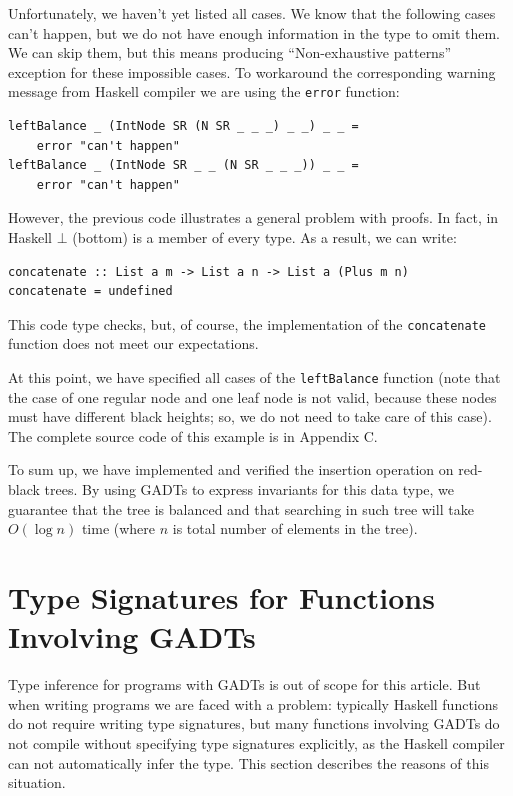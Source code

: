 \documentclass{tmr}
\begin{document}
Unfortunately, we haven't yet listed all cases. We know that the following cases can't happen, but we do not have enough information in the type to omit them. We can skip them, but this means producing ``Non-exhaustive patterns'' exception for these impossible cases. To workaround the corresponding warning message from Haskell compiler we are using the \verb|error| function:

\begin{Verbatim}
leftBalance _ (IntNode SR (N SR _ _ _) _ _) _ _ =
    error "can't happen"
leftBalance _ (IntNode SR _ _ (N SR _ _ _)) _ _ =
    error "can't happen"
\end{Verbatim}

However, the previous code illustrates a general problem with proofs. In fact, in Haskell $\bot$ (bottom) is a member of every type. As a result, we can write:

\begin{Verbatim}
concatenate :: List a m -> List a n -> List a (Plus m n)
concatenate = undefined
\end{Verbatim}

This code type checks, but, of course, the implementation of the \verb|concatenate| function does not meet our expectations.

At this point, we have specified all cases of the \verb|leftBalance| function (note that the case of one regular node and one leaf node is not valid, because these nodes must have different black heights; so, we do not need to take care of this case). The complete source code of this example is in Appendix C.

To sum up, we have implemented and verified the insertion operation on red-black trees. By using GADTs to express invariants for this data type, we guarantee that the tree is balanced and that searching in such tree will take $O (\log n)$ time (where $n$ is total number of elements in the tree).

\section{Type Signatures for Functions Involving GADTs}
\label{sec:type_signatures}

Type inference for programs with GADTs is out of scope for this article. But when writing programs we are faced with a problem: typically Haskell functions do not require writing type signatures, but many functions involving GADTs do not compile without specifying type signatures explicitly, as the Haskell compiler can not automatically infer the type. This section describes the reasons of this situation.
\end{document}
